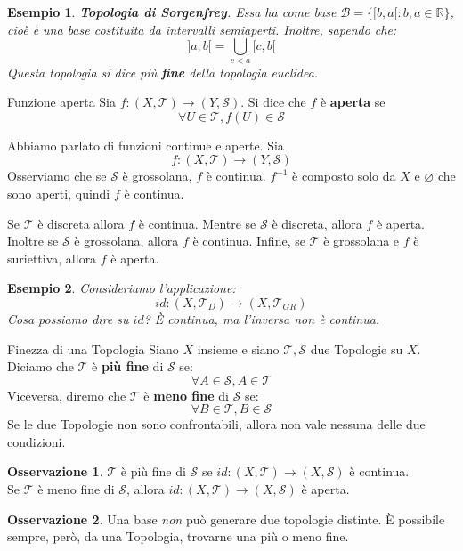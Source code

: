 \documentclass[11pt,a4paper,twoside]{article}
\newtheorem{es}{Esempio}
\theoremstyle{definition}
\newtheorem*{oss}{Osservazione}
\begin{document}
\begin{es}
	\textbf{Topologia di Sorgenfrey}. Essa ha come base $\mathcal B= \{[b,a[ : b,a \in \mathbb R\}$, cioè è una base costituita da intervalli semiaperti. Inoltre, sapendo che: \[]a,b[ = \bigcup_{c<a}[c,b[\] Questa topologia si dice più \textbf{fine} della topologia euclidea.
\end{es}

\begin{defn}{Funzione aperta}{}
	Sia $f: (X, \mathcal T) \to (Y, \mathcal S)$. Si dice che $f$ è \textbf{aperta} se \[\forall U \in \mathcal T, f(U) \in \mathcal S \]
\end{defn}

Abbiamo parlato di funzioni continue e aperte. Sia \[f \colon (X, \mathcal T) \to (Y, \mathcal S)\]
Osserviamo che se $\mathcal S$ è grossolana, $f$ è continua. $f^{-1}$ è composto solo da $X$ e $\varnothing$ che sono aperti, quindi $f$ è continua.

Se $\mathcal T$ è discreta allora $f$ è continua. Mentre se $\mathcal S$ è discreta, allora $f$ è aperta. Inoltre se $\mathcal S$ è grossolana, allora $f$ è continua.
Infine, se $\mathcal T$ è grossolana e $f$ è suriettiva, allora $f$ è aperta.

\begin{es}
	Consideriamo l'applicazione:
	\[id\colon (X, \mathcal T_D) \to (X, \mathcal T_{GR})\]
	Cosa possiamo dire su $id$? È continua, ma l'inversa non è continua.
\end{es}

\begin{defn}{Finezza di una Topologia}{}
	Siano $X$ insieme e siano $\mathcal T, \mathcal S$ due Topologie su $X$. Diciamo che $\mathcal T$ è \textbf{più fine} di $\mathcal S$ se:
	\[\forall A \in \mathcal S, A \in \mathcal T\]
	Viceversa, diremo che $\mathcal T$ è \textbf{meno fine} di $\mathcal S$ se:
	\[\forall B \in \mathcal T, B \in \mathcal S\]
	Se le due Topologie non sono confrontabili, allora non vale nessuna delle due condizioni.
\end{defn}

\begin{oss}
	$\mathcal T$ è più fine di $\mathcal S$ se $id \colon (X, \mathcal T) \to (X,\mathcal S)$ è continua.\\
	Se $\mathcal T$ è meno fine di $\mathcal S$, allora $id\colon (X, \mathcal T) \to (X, \mathcal S)$ è aperta.
\end{oss}

\begin{oss}
	Una base \textit{non} può generare due topologie distinte. È possibile sempre, però, da una Topologia, trovarne una più o meno fine.
\end{oss}
\end{document}

